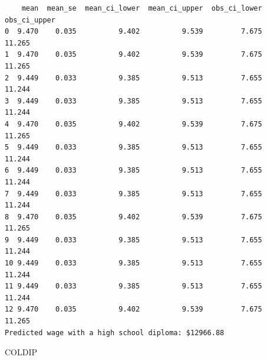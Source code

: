 \documentclass[
  11pt,
  letterpaper,
  DIV=11,
  numbers=noendperiod]{scrartcl}
\newenvironment{Shaded}{\begin{snugshade}}{\end{snugshade}}
\newcommand{\BuiltInTok}[1]{\textcolor[rgb]{0.00,0.23,0.31}{#1}}
\newcommand{\CommentTok}[1]{\textcolor[rgb]{0.37,0.37,0.37}{#1}}
\newcommand{\DecValTok}[1]{\textcolor[rgb]{0.68,0.00,0.00}{#1}}
\newcommand{\NormalTok}[1]{\textcolor[rgb]{0.00,0.23,0.31}{#1}}
\newcommand{\OperatorTok}[1]{\textcolor[rgb]{0.37,0.37,0.37}{#1}}
\newcommand{\SpecialCharTok}[1]{\textcolor[rgb]{0.37,0.37,0.37}{#1}}
\newcommand{\SpecialStringTok}[1]{\textcolor[rgb]{0.13,0.47,0.30}{#1}}
\newcommand{\StringTok}[1]{\textcolor[rgb]{0.13,0.47,0.30}{#1}}
\begin{document}
\begin{Shaded}
\end{Shaded}

\begin{verbatim}
    mean  mean_se  mean_ci_lower  mean_ci_upper  obs_ci_lower  obs_ci_upper
0  9.470    0.035          9.402          9.539         7.675        11.265
1  9.470    0.035          9.402          9.539         7.675        11.265
2  9.449    0.033          9.385          9.513         7.655        11.244
3  9.449    0.033          9.385          9.513         7.655        11.244
4  9.470    0.035          9.402          9.539         7.675        11.265
5  9.449    0.033          9.385          9.513         7.655        11.244
6  9.449    0.033          9.385          9.513         7.655        11.244
7  9.449    0.033          9.385          9.513         7.655        11.244
8  9.470    0.035          9.402          9.539         7.675        11.265
9  9.449    0.033          9.385          9.513         7.655        11.244
10 9.449    0.033          9.385          9.513         7.655        11.244
11 9.449    0.033          9.385          9.513         7.655        11.244
12 9.470    0.035          9.402          9.539         7.675        11.265
Predicted wage with a high school diploma: $12966.88
\end{verbatim}

COLDIP
\end{document}
